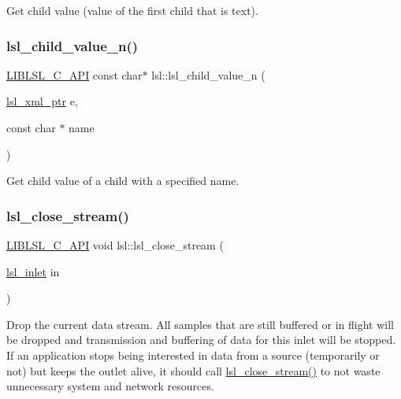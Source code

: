 Get child value (value of the first child that is text). \mbox{\label{namespacelsl_ac70e2fc6f64715cead7b4b8e776cc6e7}} 
\subsubsection{\texorpdfstring{lsl\+\_\+child\+\_\+value\+\_\+n()}{lsl\_child\_value\_n()}}
{\footnotesize\ttfamily \hyperlink{lsl__cpp_8h_aafd0ef1813e8be84a1420c4f1df64615}{L\+I\+B\+L\+S\+L\+\_\+\+C\+\_\+\+A\+PI} const char$\ast$ lsl\+::lsl\+\_\+child\+\_\+value\+\_\+n (\begin{DoxyParamCaption}\item[{\hyperlink{namespacelsl_a5edc7a49a1a1be1634fe6dce3d59c59b}{lsl\+\_\+xml\+\_\+ptr}}]{e,  }\item[{const char $\ast$}]{name }\end{DoxyParamCaption})}

Get child value of a child with a specified name. \mbox{\label{namespacelsl_a3adefb15364dacbfa8f46b5f554ed4ac}} 
\subsubsection{\texorpdfstring{lsl\+\_\+close\+\_\+stream()}{lsl\_close\_stream()}}
{\footnotesize\ttfamily \hyperlink{lsl__cpp_8h_aafd0ef1813e8be84a1420c4f1df64615}{L\+I\+B\+L\+S\+L\+\_\+\+C\+\_\+\+A\+PI} void lsl\+::lsl\+\_\+close\+\_\+stream (\begin{DoxyParamCaption}\item[{\hyperlink{namespacelsl_a884a3363cfcba75d7ce8f00c1c4c54f1}{lsl\+\_\+inlet}}]{in }\end{DoxyParamCaption})}

Drop the current data stream. All samples that are still buffered or in flight will be dropped and transmission and buffering of data for this inlet will be stopped. If an application stops being interested in data from a source (temporarily or not) but keeps the outlet alive, it should call \hyperlink{namespacelsl_a3adefb15364dacbfa8f46b5f554ed4ac}{lsl\+\_\+close\+\_\+stream()} to not waste unnecessary system and network resources. \mbox{\label{namespacelsl_a354a91fa3a4c87cdf179443650425390}} 
